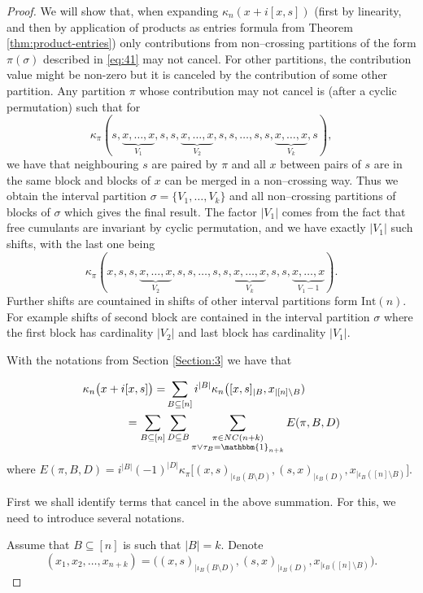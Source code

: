 \documentclass{amsart}
\begin{document}
\begin{proof}
			We will show that, when expanding $\kappa_n(x+i[x,s])$
	(first by linearity, and then by application of products as entries formula from Theorem \ref{thm:product-entries}) only contributions from non--crossing partitions of the form $\pi(\sigma)$ described in \eqref{eq:41} may not cancel.
%		
 For other partitions, the contribution value might be non-zero but it is canceled by the contribution of some other partition. 
	Any partition $\pi$ whose contribution may not cancel is (after a cyclic permutation) such that for \[\kappa_{\pi}(s,\underbrace{x,\ldots,x}_{V_1},s,s,\underbrace{x,\ldots,x}_{V_2},s,s,\ldots,s,s,\underbrace{x,\ldots,x}_{V_k},s),
	\]
	 we have that neighbouring $s$ are paired by $\pi$ and all $x$ between pairs of $s$ are in the same block and blocks of $x$ can be merged in a non--crossing way. Thus we obtain the interval partition $\sigma=\{V_1,\ldots,V_k\}$ and all non--crossing partitions of blocks of $\sigma$ which gives the final result. The factor $|V_1|$ comes from the fact that free cumulants are invariant by cyclic permutation, and we have exactly $|V_1|$ such shifts, with the last one being
	 \[\kappa_{\pi}(x,s,s,\underbrace{x,\ldots,x}_{V_2},s,s,\ldots,s,s,\underbrace{x,\ldots,x}_{V_k},s,s,\underbrace{x,\ldots,x}_{V_1-1}).
	 \]
	 Further shifts are countained in shifts of other interval partitions form $\mathrm{Int}(n)$. For example shifts of second block are contained in the interval partition $\sigma$ where the first block has cardinality $|V_2|$ and last block has cardinality $|V_1|$.


	With the notations from Section \ref{Section:3} we have that

\begin{align*}
\kappa_n\big(x +i[x,s]\big) = & 
 \sum_{B \subseteq [n] }
 i^{|B|}\kappa_n \big( [x, s]_{| B }, x_{| [n]\setminus B }  )\\
 =
 \sum_{B \subseteq [n] }  &
  \sum_{D\subseteq B }
  \sum_{\substack{\pi \in NC(n+k) \\ \pi \vee \tau_B = \mathbbm{1}_{n+k} } } 
  E (\pi, B, D)
\end{align*}	
 where \( E(\pi, B, D) =  i^{|B|}(-1)^{| D|}  \kappa_{\pi} \big[ 
(x, s)_{ | \iota_B (B \setminus D)} , (s, x)_{| \iota_B (D)} , x_{| \iota_B ([n] \setminus B )}\big].
\)

First we shall identify terms that cancel in the above summation. For this, we need to introduce several notations. 
 
Assume that 
$ B \subseteq [ n ]$ 
is such that $ | B | = k $. Denote
 \[(x_1, x_2, \dots, x_{n+ k } ) = 
\big(
(x, s)_{ | \iota_B (B \setminus D)} , (s, x)_{| \iota_B (D)} , x_{| \iota_B ([n] \setminus B )}
\big).
 \] 
 

\end{proof}
\end{document}
